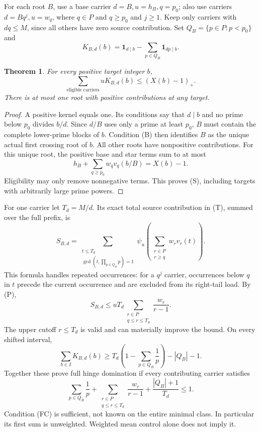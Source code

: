 \documentclass[11pt,a4paper]{article}
\newtheorem{theorem}{Theorem}[section]
\newcommand{\pos}[1]{(#1)_+}
\newcommand{\ind}{\mathbf{1}}
\begin{document}
For each root \(B\), use a base carrier \(d=B,u=h_B,q=p_0\);
also use carriers \(d=Bq^j,u=w_q\), where \(q\in P\) and \(q\ge p_0\)
and \(j\ge1\).
Keep only carriers with \(dq\le M\), since all others have zero
source contribution. Set \(Q_B=\{p\in P:p<p_0\}\) and
\[
 K_{B,d}(b)=\ind_{d\mid b}
             -\sum_{p\in Q_B}\ind_{dp\mid b}.
 \tag{K}
\]
\begin{theorem}\label{thm:star}
For every positive target integer \(b\),
\[
 \sum_{\text{eligible carriers}}uK_{B,d}(b)
 \le\pos{X(b)-1}.
 \tag{S}
\]
There is at most one root with positive contributions at any target.
\end{theorem}
\begin{proof}
A positive kernel equals one. Its conditions say that \(d\mid b\)
and no prime below \(p_0\) divides \(b/d\).
Since \(d/B\) uses only a prime at least \(p_0\), \(B\) must contain
the complete lower-prime blocks of \(b\).
Condition (B) then identifies \(B\) as the unique actual first
crossing root of \(b\). All other roots have nonpositive contributions.
For this unique root, the positive base and star terms sum to at most
\[
 h_B+\sum_{q\ge p_0}w_qv_q(b/B)=X(b)-1.
\]
Eligibility may only remove nonnegative terms. This proves (S),
including targets with arbitrarily large prime powers.
\end{proof}

For one carrier let \(T_d=M/d\). Its exact total source contribution
in (T), summed over the full prefix, is
\[
 S_{B,d}=
 \sum_{\substack{t\le T_d\\
          \gcd(t,\prod_{p\in Q_B}p)=1}}
       \psi_u\!\left(\sum_{\substack{r\in P\\r\ge q}}
                       w_rv_r(t)\right).
 \tag{F}
\]
This formula handles repeated occurrences: for a \(q^j\) carrier,
occurrences below \(q\) in \(t\) precede the current occurrence and
are excluded from its right-tail load. By (P),
\[
 S_{B,d}\le
 uT_d\sum_{\substack{r\in P\\q\le r\le T_d}}\frac{w_r}{r-1}.
 \tag{F1}
\]
The upper cutoff \(r\le T_d\) is valid and can materially improve
the bound. On every shifted interval,
\[
 \sum_{b\in I}K_{B,d}(b)
 \ge T_d\left(1-\sum_{p\in Q_B}\frac1p\right)-|Q_B|-1.
 \tag{F2}
\]
Together these prove full hinge domination if every contributing
carrier satisfies
\[
 \sum_{p\in Q_B}\frac1p+
 \sum_{\substack{r\in P\\q\le r\le T_d}}\frac{w_r}{r-1}
 +\frac{|Q_B|+1}{T_d}\le1.
 \tag{FC}
\]
Condition (FC) is sufficient, not known on the entire minimal class.
In particular its first sum is unweighted. Weighted mean control
alone does not imply it.
\end{document}
